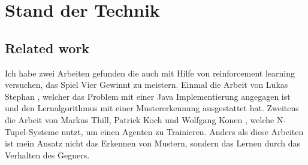 \chapter{Stand der Technik}
\label{cha:Technik}

\section{Related work}
Ich habe zwei Arbeiten gefunden die auch mit Hilfe von reinforcement learning versuchen, das Spiel Vier Gewinnt zu meistern. Einmal die Arbeit von Lukas Stephan \cite{Stephan2018}, welcher das Problem mit einer Java Implementierung angegagen ist und den Lernalgorithmus mit einer Mustererkennung ausgestattet hat. Zweitens die Arbeit von Markus Thill, Patrick Koch und Wolfgang Konen \cite{Thill2012}, welche N-Tupel-Systeme nutzt, um einen Agenten zu Trainieren. Anders als diese Arbeiten ist mein Ansatz nicht das Erkennen von Mustern, sondern das Lernen durch das Verhalten des Gegners.









